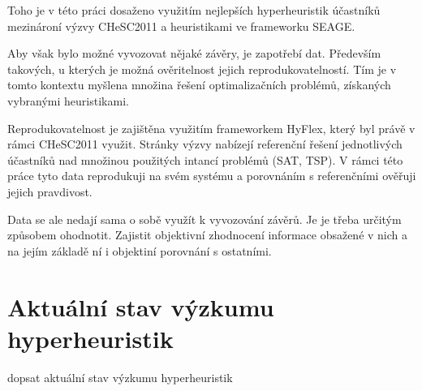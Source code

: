 
Toho je v této práci dosaženo využitím nejlepších hyperheuristik účastníků mezinároní výzvy CHeSC2011 a heuristikami ve frameworku SEAGE.


Aby však bylo možné vyvozovat nějaké závěry, je zapotřebí dat. Především takových, u kterých je možná ověritelnost jejich reprodukovatelností. Tím je v tomto kontextu myšlena množina řešení optimalizačních problémů, získaných vybranými heuristikami.

Reprodukovatelnost je zajištěna využitím frameworkem HyFlex, který byl právě v rámci CHeSC2011 využit. Stránky výzvy nabízejí referenční řešení jednotlivých účastníků nad množinou použitých intancí problémů (SAT, TSP). V rámci této práce tyto data reprodukuji na svém systému a porovnáním s referenčními ověřuji jejich pravdivost. 

Data se ale nedají sama o sobě využít k vyvozování závěrů. Je je třeba určitým způsobem ohodnotit. Zajistit objektivní zhodnocení informace obsažené v nich a na jejím základě ní i objektiní porovnání s ostatními.



\section{Aktuální stav výzkumu hyperheuristik}

dopsat aktuální stav výzkumu hyperheuristik
\cite{DRAKE2020405}
